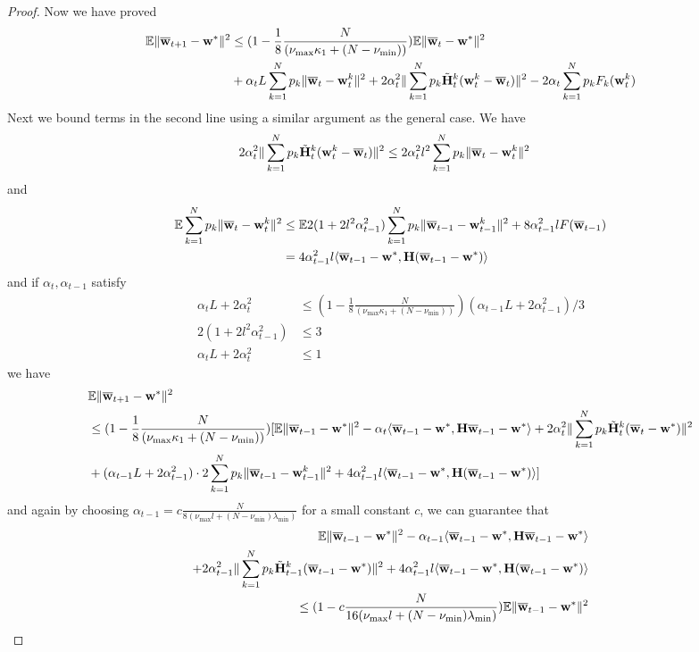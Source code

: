 \begin{proof}
	Now we have proved 
	\begin{align*}
	\mathbb{E}\|{\overline{\mathbf{w}}}_{t+1}-{\mathbf{w}}^{\ast}\|^{2} & \leq(1-\frac{1}{8}\frac{N}{(\nu_{\max}\kappa_{1}+(N-\nu_{\min}))})\mathbb{E}\|{\overline{\mathbf{w}}}_{t}-{\mathbf{w}}^{\ast}\|^{2}\\
	& +\alpha_{t}L\sum_{k=1}^{N}p_{k}\|{\overline{\mathbf{w}}}_{t}-{\mathbf{w}}_{t}^{k}\|^{2}+2\alpha_{t}^{2}\|\sum_{k=1}^{N}p_{k}\tilde{{\mathbf{H}}}_{t}^{k}({\mathbf{w}}_{t}^{k}-{\overline{\mathbf{w}}}_{t})\|^{2}-2\alpha_{t}\sum_{k=1}^{N}p_{k}F_{k}({\mathbf{w}}_{t}^{k})
	\end{align*}
	Next we bound terms in the second line using a similar argument as
	the general case. We have 
	\begin{align*}
	2\alpha_{t}^{2}\|\sum_{k=1}^{N}p_{k}\tilde{{\mathbf{H}}}_{t}^{k}({\mathbf{w}}_{t}^{k}-{\overline{\mathbf{w}}}_{t})\|^{2} & \leq2\alpha_{t}^{2}l^{2}\sum_{k=1}^{N}p_{k}\|{\overline{\mathbf{w}}}_{t}-{\mathbf{w}}_{t}^{k}\|^{2}
	\end{align*}
	and 
	\begin{align*}
	\mathbb{E}\sum_{k=1}^{N}p_{k}\|{\overline{\mathbf{w}}}_{t}-{\mathbf{w}}_{t}^{k}\|^{2} & \leq\mathbb{E}2(1+2l^{2}\alpha_{t-1}^{2})\sum_{k=1}^{N}p_{k}\|{\overline{\mathbf{w}}}_{t-1}-{\mathbf{w}}_{t-1}^{k}\|^{2}+8\alpha_{t-1}^{2}lF({\overline{\mathbf{w}}}_{t-1})\\
	& =4\alpha_{t-1}^{2}l\langle{\overline{\mathbf{w}}}_{t-1}-{\mathbf{w}}^{\ast},{\mathbf{H}}({\overline{\mathbf{w}}}_{t-1}-{\mathbf{w}}^{\ast})\rangle
	\end{align*}
	and if $\alpha_{t},\alpha_{t-1}$ satisfy 
	\begin{align*}
	\alpha_{t}L+2\alpha_{t}^{2} & \leq(1-\frac{1}{8}\frac{N}{(\nu_{\max}\kappa_{1}+(N-\nu_{\min}))})(\alpha_{t-1}L+2\alpha_{t-1}^{2})/3\\
	2(1+2l^{2}\alpha_{t-1}^{2}) & \leq3\\
	\alpha_{t}L+2\alpha_{t}^{2} & \leq1
	\end{align*}
	we have 
	\begin{align*}
	& \mathbb{E}\|{\overline{\mathbf{w}}}_{t+1}-{\mathbf{w}}^{\ast}\|^{2}\\
	& \leq(1-\frac{1}{8}\frac{N}{(\nu_{\max}\kappa_{1}+(N-\nu_{\min}))})[\mathbb{E}\|{\overline{\mathbf{w}}}_{t-1}-{\mathbf{w}}^{\ast}\|^{2}-\alpha_{t}\langle{\overline{\mathbf{w}}}_{t-1}-{\mathbf{w}}^{\ast},{\mathbf{H}}{\overline{\mathbf{w}}}_{t-1}-{\mathbf{w}}^{\ast}\rangle+2\alpha_{t}^{2}\|\sum_{k=1}^{N}p_{k}\tilde{{\mathbf{H}}}_{t}^{k}({\overline{\mathbf{w}}}_{t}-{\mathbf{w}}^{\ast})\|^{2}\\
	& +(\alpha_{t-1}L+2\alpha_{t-1}^{2})\cdot2\sum_{k=1}^{N}p_{k}\|{\overline{\mathbf{w}}}_{t-1}-{\mathbf{w}}_{t-1}^{k}\|^{2}+4\alpha_{t-1}^{2}l\langle{\overline{\mathbf{w}}}_{t-1}-{\mathbf{w}}^{\ast},{\mathbf{H}}({\overline{\mathbf{w}}}_{t-1}-{\mathbf{w}}^{\ast})\rangle]
	\end{align*}
	and again by choosing $\alpha_{t-1}=c\frac{N}{8(\nu_{\max}l+(N-\nu_{\min})\lambda_{\min})}$
	for a small constant $c$, we can guarantee that 
	\begin{align*}
	\mathbb{E}\|{\overline{\mathbf{w}}}_{t-1}-{\mathbf{w}}^{\ast}\|^{2}-\alpha_{t-1}\langle{\overline{\mathbf{w}}}_{t-1}-{\mathbf{w}}^{\ast},{\mathbf{H}}{\overline{\mathbf{w}}}_{t-1}-{\mathbf{w}}^{\ast}\rangle\\
	+2\alpha_{t-1}^{2}\|\sum_{k=1}^{N}p_{k}\tilde{{\mathbf{H}}}_{t-1}^{k}({\overline{\mathbf{w}}}_{t-1}-{\mathbf{w}}^{\ast})\|^{2}+4\alpha_{t-1}^{2}l\langle{\overline{\mathbf{w}}}_{t-1}-{\mathbf{w}}^{\ast},{\mathbf{H}}({\overline{\mathbf{w}}}_{t-1}-{\mathbf{w}}^{\ast})\rangle\\
	\leq(1-c\frac{N}{16(\nu_{\max}l+(N-\nu_{\min})\lambda_{\min})})\mathbb{E}\|{\overline{\mathbf{w}}}_{t-1}-{\mathbf{w}}^{\ast}\|^{2}
	\end{align*}
	

\end{proof}
